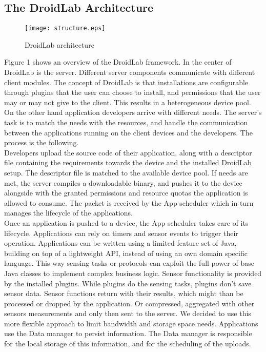 \documentclass[conference,letterpaper]{IEEEtran}
\begin{document}
\subsection{The DroidLab Architecture}
\label{arch}
\begin{figure}
\centering
	\texttt{[image: structure.eps]}
	\label{fig:structureImage}
\caption{DroidLab architecture}
\end{figure}
Figure 1 shows an overview of the DroidLab framework. In the center of DroidLab is the server. Different server components communicate with different client modules. The concept of DroidLab is that installations are configurable through plugins that the user can choose to install, and permissions that the user may or may not give to the client. This results in a heterogeneous device pool. On the other hand application developers arrive with different needs. The server's task is to match the needs with the resources, and handle the communication between the applications running on the client devices and the developers. The process is the following.\\
\indent Developers upload the source code of their application, along with a descriptor file containing the requirements towards the device and the installed DroidLab setup. The descriptor file is matched to the available device pool. If needs are met, the server compiles a downloadable binary, and pushes it to the device alongside with the granted permissions and resource quotas the application is allowed to consume. The packet is received by the App scheduler which in turn manages the lifecycle of the applications.\\
\indent Once an application is pushed to a device, the App scheduler takes care of its lifecycle. Applications can rely on timers and sensor events to trigger their operation. Applications can be written using a limited feature set of Java, building on top of a lightweight API, instead of using an own domain specific language. This way sensing tasks or protocols can exploit the full power of base Java classes to implement complex business logic. Sensor functionality is provided by the installed plugins. While plugins do the sensing tasks, plugins don't save sensor data. Sensor functions return with their results, which might than be processed or dropped by the application. Or compressed, aggregated with other sensors measurements and only then sent to the server. We decided to use this more flexible approach to limit bandwidth and storage space needs. Applications use the Data manager to persist information. The Data manager is responsible for the local storage of this information, and for the scheduling of the uploads.\\
\end{document}
